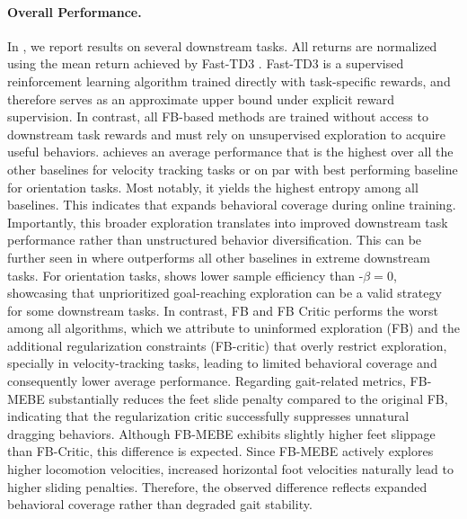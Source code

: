 \paragraph{Overall Performance.}
In , we report results on several downstream tasks. All returns are normalized using the mean return achieved by Fast-TD3 \citep{seo-2025}. Fast-TD3 is a supervised reinforcement learning algorithm trained directly with task-specific rewards, and therefore serves as an approximate upper bound under explicit reward supervision. In contrast, all FB-based methods are trained without access to downstream task rewards and must rely on unsupervised exploration to acquire useful behaviors. %
 \method achieves an average performance that is the highest over all the other baselines for velocity tracking tasks or on par with best performing baseline for orientation tasks. Most notably, it yields the highest entropy among all baselines. This indicates that \method expands behavioral coverage during online training. Importantly, this broader exploration translates into improved downstream task performance rather than unstructured behavior diversification. This can be further seen in  where \method outperforms all other baselines in extreme downstream tasks. For orientation tasks, \method shows lower sample efficiency than \method-$\beta=0$, showcasing that unprioritized goal-reaching exploration can be a valid strategy for some downstream tasks. In contrast, FB and FB Critic performs the worst among all algorithms, which we attribute to uninformed exploration (FB) and the additional regularization constraints (FB-critic) that overly restrict exploration, specially in velocity-tracking tasks, leading to limited behavioral coverage and consequently lower average performance.  Regarding gait-related metrics, FB-MEBE substantially reduces the feet slide penalty compared to the original FB, indicating that the regularization critic successfully suppresses unnatural dragging behaviors. Although FB-MEBE exhibits slightly higher feet slippage than FB-Critic, this difference is expected. Since FB-MEBE actively explores higher locomotion velocities, increased horizontal foot velocities naturally lead to higher sliding penalties. Therefore, the observed difference reflects expanded behavioral coverage rather than degraded gait stability. %

